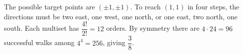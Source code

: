 The possible target points are $(\pm1,\pm1)$. To reach $(1,1)$ in four steps, the directions must be two east, one west, one north, or one east, two north, one south. Each multiset has $\dfrac{4!}{2!}=12$ orders. By symmetry there are $4\cdot24=96$ successful walks among $4^4=256$, giving $\boxed{\dfrac{3}{8}}$.
